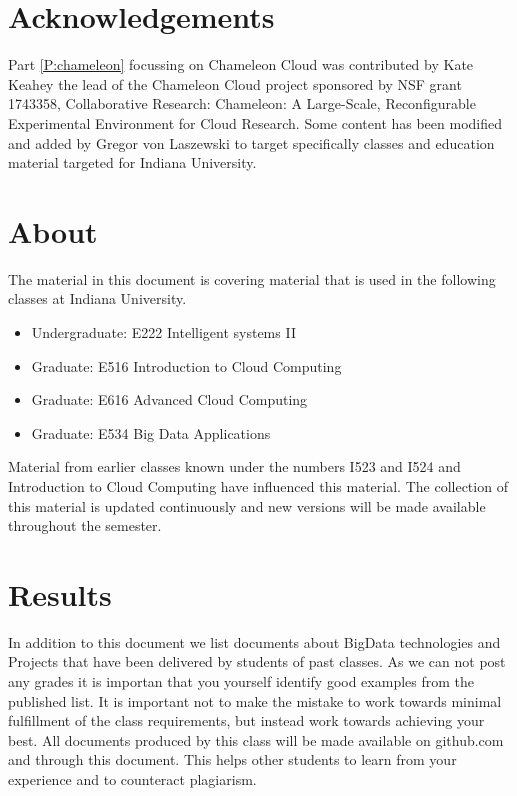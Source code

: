 \section{Acknowledgements}

Part \ref{P:chameleon} focussing on Chameleon Cloud was contributed by
Kate Keahey the lead of the Chameleon Cloud project sponsored by NSF
grant 1743358, Collaborative Research: Chameleon: A Large-Scale,
Reconfigurable Experimental Environment for Cloud Research. Some
content has been modified and added by Gregor von Laszewski to target
specifically classes and education material targeted for Indiana
University.

\section{About}

The material in this document is covering material that is used in the
following classes at Indiana University.

\begin{itemize}
\item Undergraduate: E222 Intelligent systems II
\item Graduate: E516 Introduction to Cloud Computing
\item Graduate: E616 Advanced Cloud Computing
\item Graduate: E534 Big Data Applications
\end{itemize}

Material from earlier classes known under the numbers I523 and I524
and Introduction to Cloud Computing have influenced this material. The
collection of this material is updated continuously and new versions
will be made available throughout the semester.

\section{Results}\label{S:results}

In addition to this document we list documents about BigData
technologies and Projects that have been delivered by students of past
classes. As we can not post any grades it is importan that you
yourself identify good examples from the published list. It is
important not to make the mistake to work towards minimal fulfillment
of the class requirements, but instead work towards achieving your
best. All documents produced by this class will be made available on
github.com and through this document. This helps other students to
learn from your experience and to counteract plagiarism.

